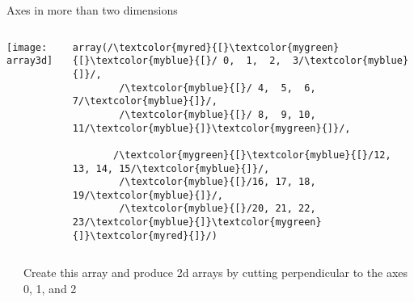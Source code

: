 \begin{frame}[fragile]{Axes in more than two dimensions}
 \begin{columns}
  \begin{column}{0.4\linewidth}
   \begin{center}
   \texttt{[image: array3d]}
   \end{center}
  \end{column}%
  \begin{column}{0.6\linewidth}
   \begin{verbatim}
array(/\textcolor{myred}{[}\textcolor{mygreen}{[}\textcolor{myblue}{[}/ 0,  1,  2,  3/\textcolor{myblue}{]}/,
        /\textcolor{myblue}{[}/ 4,  5,  6,  7/\textcolor{myblue}{]}/,
        /\textcolor{myblue}{[}/ 8,  9, 10, 11/\textcolor{myblue}{]}\textcolor{mygreen}{]}/,

       /\textcolor{mygreen}{[}\textcolor{myblue}{[}/12, 13, 14, 15/\textcolor{myblue}{]}/,
        /\textcolor{myblue}{[}/16, 17, 18, 19/\textcolor{myblue}{]}/,
        /\textcolor{myblue}{[}/20, 21, 22, 23/\textcolor{myblue}{]}\textcolor{mygreen}{]}\textcolor{myred}{]}/)
    \end{verbatim}%
  \end{column}
 \end{columns}

 \vspace{0.5truecm}
 \begin{columns}
  \begin{column}{0.3\linewidth}
  \end{column}%
  \begin{column}{0.6\linewidth}
   Create this array and produce 2d arrays by cutting perpendicular to the axes 0, 1, and 2
  \end{column}
 \end{columns}
\end{frame}

